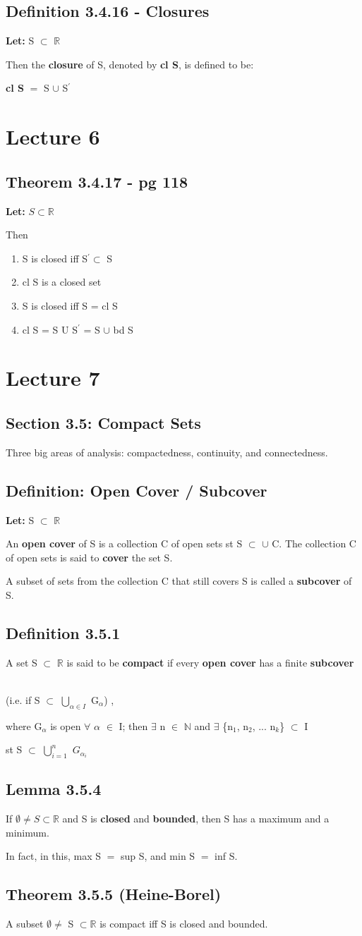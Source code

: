 \documentclass{article}
\newcommand{\mt}[1]{\ensuremath{#1}}
\newcommand\bsc[2][\DefaultOpt]{%
  \def\DefaultOpt{#2}%
  \section[#1]{#2}%
}
\newcommand\ssc[2][\DefaultOpt]{%
  \def\DefaultOpt{#2}%
  \subsection[#1]{#2}%
}
\newcommand{\balist}{\begin{enumerate}[label=\alph*.]}
\newcommand{\elist}{\end{enumerate}}
\newcommand{\lt}[1]{\textbf{Let: } #1}
\newcommand{\dbs}[3]{\mt{#1_{#2_#3}}}
\newcommand{\br}{\mt{\mathbb{R}} }       %
\newcommand{\bn}{\mt{\mathbb{N}} }       %
\newcommand{\fa}{\mt{\forall} }          %
\newcommand{\afa}{\mt{\alpha} }
\newcommand{\mem}{\mt{\in} }
\newcommand{\exs}{\mt{\exists} }
\newcommand{\es}{\mt{\emptyset} }        %
\newcommand{\sbs}{\mt{\subset} }         %
\newcommand{\fs}[2]{\{\uw{#1}{1}, \uw{#1}{2}, ... \uw{#1}{#2}\}}
\newcommand{\eql}{\mt{=} }
\newcommand{\pr}{\mt{^\prime} } 		   %
\newcommand{\uw}[2]{#1\mt{_{#2}}}
\newcommand{\urng}[2]{\mt{\bigcup_{#1}^{#2}}}
\begin{document}
{{{}

\ssc{Definition 3.4.16 - Closures}{

\lt{S \sbs \br}

Then the \textbf{closure} of S, denoted by \textbf{cl S}, is defined to be:

\textbf{cl S} \eql S $\cup$ S\pr \
}

}

\newpage

\bsc{Lecture 6}{

\ssc{Theorem 3.4.17 - pg 118}

\lt{$S \sbs \br$} 

Then

\balist
\item S is closed iff S$\pr \sbs$ S
\item cl S is a closed set
\item S is closed iff S = cl S
\item cl S = S U S$\pr$ = S $\cup$ bd S
\elist
}

}

\newpage

\bsc{Lecture 7}{

\ssc{Section 3.5: Compact Sets}{
Three big areas of analysis: compactedness, continuity, and connectedness.
}

\ssc{Definition: Open Cover / Subcover}{

\lt{S \sbs \br}

An \textbf{open cover} of S is a collection C of open sets st S \sbs $\cup$ C. The collection C of open sets is said to \textbf{cover} the set S.

A subset of sets from the collection C that still covers S is called a \textbf{subcover} of S.

}

\ssc{Definition 3.5.1}{A set S \sbs \br  is said to be \textbf{compact} if every \textbf{open cover} has a finite \textbf{subcover} \

(i.e. if S \sbs \urng{\alpha \in I}{} \uw{G}{\afa}) , \

where \uw{G}{\afa} is open \fa \afa \mem I; then \exs n \mem \bn and \exs \fs{n}{k} \sbs I \

st S \sbs \urng{i=1}{n} \dbs{G}{\alpha}{i}
}

\ssc{Lemma 3.5.4}{
If $\es \neq S \sbs \br$ and S is \textbf{closed} and \textbf{bounded}, then S has a maximum and a minimum. 

In fact, in this, max S $=$ sup S, and min S $=$ inf S.
}

\ssc{Theorem 3.5.5 (Heine-Borel)}{

A subset $\es \neq$ S $\sbs \br$ is compact iff S is closed and bounded.
}


}
\end{document}
